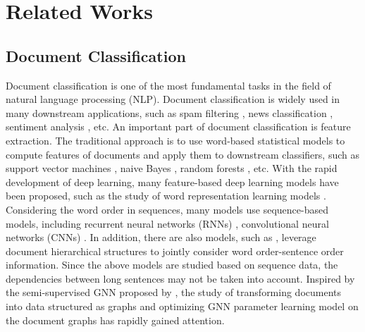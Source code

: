\documentclass[letterpaper]{article} %
\begin{document}
\section{Related Works}
\subsection{Document Classification}
Document classification is one of the most fundamental tasks in the field of natural language processing (NLP). Document classification is widely used in many downstream applications, such as spam filtering \cite{wu2020graph}, news classification \cite{liu2018early}, sentiment analysis \cite{medhat2014sentiment}, etc.
An important part of document classification is feature extraction. The traditional approach is to use word-based statistical models to compute features of documents and apply them to downstream classifiers, such as support vector machines \cite{suykens1999least}, naive Bayes \cite{mccallum1998comparison}, random forests \cite{svetnik2003random}, etc.
With the rapid development of deep learning, many feature-based deep learning models have been proposed, such as the study of word representation learning models \cite{mikolov2013distributed, grover2016node2vec}.
Considering the word order in sequences, many models use sequence-based models, including recurrent neural networks (RNNs) \cite{mikolov2010recurrent,liu2016recurrent}, convolutional neural networks (CNNs) \cite{kim-2014-convolutional}.
In addition, there are also models, such as \cite{yang2016hierarchical,8933476}, leverage document hierarchical structures to jointly consider word order-sentence order information.
Since the above models are studied based on sequence data, the dependencies between long sentences may not be taken into account.
Inspired by the semi-supervised GNN proposed by \cite{kipf2017semi}, the study of transforming documents into data structured as graphs and optimizing GNN parameter learning model on the document graphs has rapidly gained attention.
\end{document}
